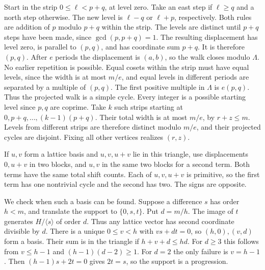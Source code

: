 \documentclass[11pt,reqno]{amsart}
\theoremstyle{remark}
\numberwithin{equation}{section}
\begin{document}
Start in the strip \(0\le\ell<p+q\), at level zero. Take an east step if
\(\ell\ge q\) and a north step otherwise. The new level is \(\ell-q\) or
\(\ell+p\), respectively. Both rules are addition of \(p\) modulo \(p+q\)
within the strip. The levels are distinct until \(p+q\) steps have been
made, since \(\gcd(p,p+q)=1\). The resulting displacement has level zero,
is parallel to \((p,q)\), and has coordinate sum \(p+q\). It is therefore
\((p,q)\). After \(e\) periods the displacement is \((a,b)\), so the walk
closes modulo \(\Lambda\). No earlier repetition is possible. Equal
cosets within the strip must have equal levels, since the width is at
most \(m/e\), and equal levels in different periods are separated by a
multiple of \((p,q)\). The first positive multiple in \(\Lambda\) is
\(e(p,q)\). Thus the projected walk is a simple cycle. Every integer is a
possible starting level since \(p,q\) are coprime. Take \(k\) such strips
starting at \(0,p+q,\ldots,(k-1)(p+q)\). Their total width is at most
\(m/e\), by \(r+z\le m\). Levels from different strips are therefore
distinct modulo \(m/e\), and their projected cycles are disjoint. Fixing
all other vertices realizes \((r,z)\).

If \(u,v\) form a lattice basis and \(u,v,u+v\) lie in this triangle, use
displacements \(0,u+v\) in two blocks, and \(u,v\) in the same two blocks
for a second term. Both terms have the same total shift counts. Each of
\(u,v,u+v\) is primitive, so the first term has one nontrivial cycle and
the second has two. The signs are opposite.

We check when such a basis can be found. Suppose a difference \(s\) has
order \(h<m\), and translate the support to \(\{0,s,t\}\). Put \(d=m/h\).
The image of \(t\) generates \(H/\langle s\rangle\) of order \(d\). Thus
any lattice vector has second coordinate divisible by \(d\). There is a
unique \(0\le v<h\) with \(vs+dt=0\), so \((h,0),(v,d)\) form a basis.
Their sum is in the triangle if \(h+v+d\le hd\). For \(d\ge3\) this
follows from \(v\le h-1\) and \((h-1)(d-2)\ge1\). For \(d=2\) the only
failure is \(v=h-1\). Then \((h-1)s+2t=0\) gives \(2t=s\), so the support
is a progression.
\end{document}
